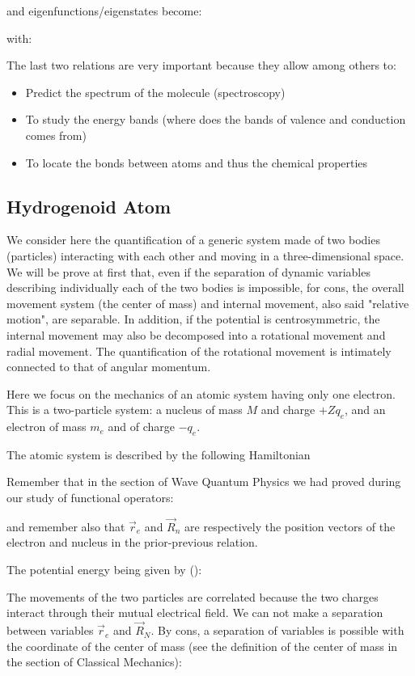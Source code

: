 	and eigenfunctions/eigenstates become:
	
	with:
	
	The last two relations are very important because they allow among others to:
	\begin{itemize}
		\item Predict the spectrum of the molecule (spectroscopy)
		\item To study the energy bands (where does the bands of valence and conduction comes from)
		\item To locate the bonds between atoms and thus the chemical properties
	\end{itemize}
	
	\subsection{Hydrogenoid Atom}
	We consider here the quantification of a generic system made of two bodies (particles) interacting with each other and moving in a three-dimensional space. We will be prove at first that, even if the separation of dynamic variables describing individually each of the two bodies is impossible, for cons, the overall movement system (the center of mass) and internal movement, also said "relative motion", are separable. In addition, if the potential is centrosymmetric, the internal movement may also be decomposed into a rotational movement and radial movement. The quantification of the rotational movement is intimately connected to that of angular momentum.
	
	Here we focus on the mechanics of an atomic system having only one electron. This is a two-particle system: a nucleus of mass $M$ and charge $+Zq_e$, and an electron of mass $m_e$ and of charge $-q_e$.
	
	The atomic system is described by the following Hamiltonian
	
	Remember that in the section of Wave Quantum Physics we had proved during our study of functional operators:
	
	and remember also that $\vec{r}_e$ and $\vec{R}_n$ are respectively the position vectors of the electron and nucleus in the prior-previous relation.
	
	The potential energy being given by ():
	
	The movements of the two particles are correlated because the two charges interact through their mutual electrical field. We can not make a separation between variables $\vec{r}_e$ and $\vec{R}_N$. By cons, a separation of variables is possible with the coordinate of the center of mass (see the definition of the center of mass in the section of Classical Mechanics):
	
